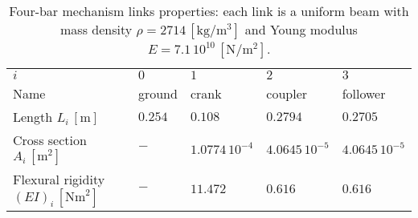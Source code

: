 \begin{table}[bt]
	\centering
	\caption{Four-bar mechanism links properties: each link is a uniform beam with mass density $\rho=2714\,[\mathrm{kg}/\mathrm{m}^3]$ and Young modulus $E=7.1\,10^{10}\,[\mathrm{N}/\mathrm{m}^2]$. }
	\label{tab:data_4bars}       %
	\begin{tabular}{lllll}
		\hline\noalign{\smallskip}
		$i$ & $0$ &  $1$ &  $2$ &  $3$  \\
		\noalign{\smallskip}\hline\noalign{\smallskip}
		Name & ground & crank & coupler & follower \\ 
		Length $L_i\,[\mathrm{m}]$ & $0.254$ & $0.108$ & $0.2794$ & $0.2705$\\
		Cross section $A_i\,[\mathrm{m}^2]$ & $-$ & $1.0774\,10^{-4}$ & $4.0645\,10^{-5}$ & $4.0645\,10^{-5}$ \\
		Flexural rigidity $(EI)_i\,[\mathrm{Nm}^2]$ & $-$ & $11.472$ & $0.616$ & $0.616$ \\
		\hline
	\end{tabular}
\end{table}

